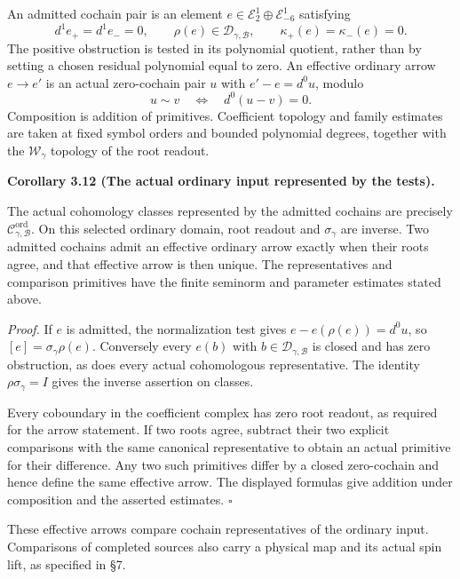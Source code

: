 \documentclass[
  english,
  11pt,
  reqno]{amsart}
\makeatletter
\newcommand{\pandocstatementheading}[1]{%
  \par\if@nobreak\else
    \addpenalty{\@beginparpenalty}%
    \addvspace{.5\baselineskip plus .2\baselineskip minus .2\baselineskip}%
  \fi
  {\normalfont\bfseries #1\par}%
  \nobreak\@afterindenttrue\@afterheading
}
\makeatother
\begin{document}
An admitted cochain pair is an element
\(e\in\mathscr E_2^1\oplus\mathscr E_{-6}^1\) satisfying%
 \[
d^1e_+=d^1e_-=0,
\qquad \rho(e)\in\mathscr D_{\gamma,\mathcal B},
\qquad \kappa_+(e)=\kappa_-(e)=0.
\] The positive obstruction is tested in its polynomial quotient, rather
than by setting a chosen residual polynomial equal to zero. An effective
ordinary arrow \(e\to e'\) is an actual zero-cochain pair \(u\) with
\(e'-e=d^0u\), modulo%
 \[
u\sim v\quad\Longleftrightarrow\quad d^0(u-v)=0.
\] Composition is addition of primitives. Coefficient topology and
family estimates are taken at fixed symbol orders and bounded polynomial
degrees, together with the \(\mathscr W_\gamma\) topology of the root
readout.

\pandocstatementheading{\leavevmode{}\label{cor:online-effective-ordinary-class-identification}Corollary 3.12 (The actual ordinary input represented by the tests).}

The actual cohomology classes represented by the admitted cochains are
precisely \(\mathscr C^{\mathrm{ord}}_{\gamma,\mathcal B}\). On this
selected ordinary domain, root readout and \(\sigma_\gamma\) are
inverse. Two admitted cochains admit an effective ordinary arrow exactly
when their roots agree, and that effective arrow is then unique. The
representatives and comparison primitives have the finite seminorm and
parameter estimates stated above.

\emph{Proof.} If \(e\) is admitted, the normalization test gives
\(e-e(\rho(e))=d^0u\), so \([e]=\sigma_\gamma\rho(e)\). Conversely every
\(e(b)\) with \(b\in\mathscr D_{\gamma,\mathcal B}\) is closed and has
zero obstruction, as does every actual cohomologous representative. The
identity \(\rho\sigma_\gamma=I\) gives the inverse assertion on classes.

Every coboundary in the coefficient complex has zero root readout, as
required for the arrow statement. If two roots agree, subtract their two
explicit comparisons with the same canonical representative to obtain an
actual primitive for their difference. Any two such primitives differ by
a closed zero-cochain and hence define the same effective arrow. The
displayed formulas give addition under composition and the asserted
estimates. \hfill\(\square\)

These effective arrows compare cochain representatives of the ordinary
input. Comparisons of completed sources also carry a physical map and
its actual spin lift, as specified in §7.
\end{document}
